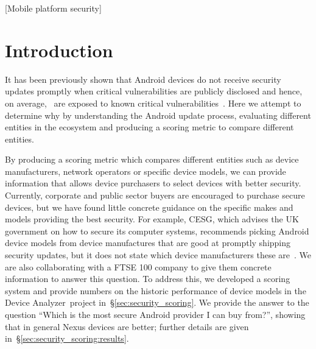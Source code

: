 \documentclass{sig-alternate-2013}
\newcommand{\da}{Device Analyzer}
\begin{document}
[Mobile platform security]



\section{Introduction}

It has been previously shown that Android devices do not receive security updates promptly when critical vulnerabilities are publicly disclosed and hence, on average, \daMeanInsecurityPercNominal\ are exposed to known critical vulnerabilities~\cite{androidvulnerabilities.org}.
Here we attempt to determine why by understanding the Android update process, evaluating different entities in the ecosystem and producing a scoring metric to compare different entities.

By producing a scoring metric which compares different entities such as device manufacturers, network operators or specific device models, we can provide information that allows device purchasers to select devices with better security.
Currently, corporate and public sector buyers are encouraged to purchase secure devices, but we have found little concrete guidance on the specific makes and models providing the best security.
For example, CESG, which advises the UK government on how to secure its computer systems, recommends picking Android device models from device manufactures that are good at promptly shipping security updates, but it does not state which device manufacturers these are~\cite{CESG2013}.
We are also collaborating with a FTSE 100 company to give them concrete information to answer this question.
To address this, we developed a scoring system and provide numbers on the historic performance of device models in the \da\ project in~\S\ref{sec:security_scoring}.
We provide the answer to the question ``Which is the most secure Android provider I can buy from?'', showing that in general Nexus devices are better; further details are given in~\S\ref{sec:security_scoring:results}.
\end{document}
